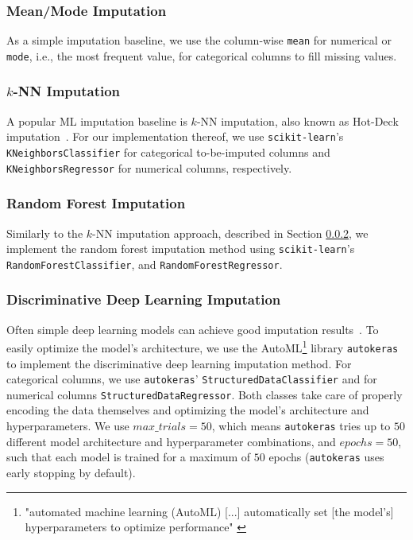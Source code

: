 \documentclass[utf8]{frontiersSCNS} %
\newcommand{\code}[1]{\texttt{#1}}
\begin{document}
\subsubsection{Mean/Mode Imputation}
\label{sec:simple_imputation}
%
As a simple imputation baseline, we use the column-wise \code{mean} for numerical or \code{mode}, i.e., the most frequent value,  for categorical columns to fill missing values.


\subsubsection{$k$-NN Imputation}
\label{sec:knKNN}
%
A popular ML imputation baseline is $k$-NN imputation, also known as Hot-Deck imputation~\citep{Batista2003}. For our implementation thereof, we use \code{scikit-learn}'s \code{KNeighborsClassifier} for categorical to-be-imputed columns and \code{KNeighborsRegressor} for numerical columns, respectively.


\subsubsection{Random Forest Imputation}
%
Similarly to the $k$-NN imputation approach, described in Section \ref{sec:knKNN}, we implement the random forest imputation method using \code{scikit-learn}'s \code{RandomForestClassifier}, and \code{RandomForestRegressor}.



\subsubsection{Discriminative Deep Learning Imputation}
\label{sec:dl_imputation}
%
Often simple deep learning models can achieve good imputation results~\citep{Biessmann2018a}. To easily optimize the model's architecture, we use the AutoML\footnote{"automated machine learning (AutoML) [...] automatically set [the model's] hyperparameters to optimize performance" \cite{AutoML}} library \code{autokeras} \citep{AutoKeras} to implement the discriminative deep learning imputation method.
For categorical columns, we use \code{autokeras}' \code{StructuredDataClassifier} and for numerical columns \code{StructuredDataRegressor}. Both classes take care of properly encoding the data themselves and optimizing the model's architecture and hyperparameters. We use $max\_trials = 50$, which means \code{autokeras} tries up to $50$ different model architecture and hyperparameter combinations, and $epochs = 50$, such that each model is trained for a maximum of $50$ epochs (\code{autokeras} uses early stopping by default).
\end{document}

